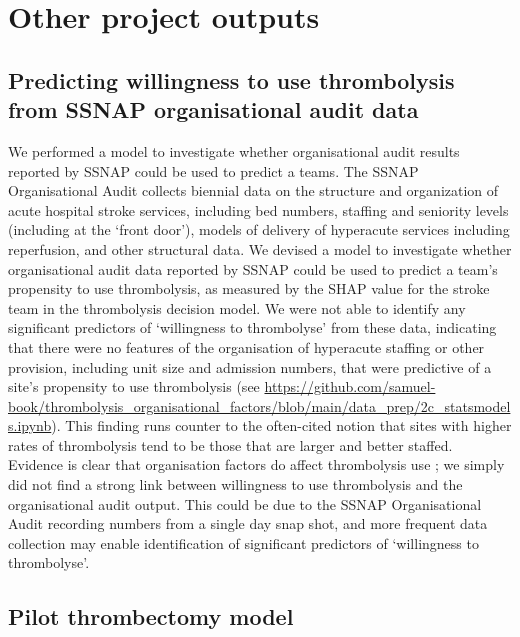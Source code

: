\section{Other project outputs}

\subsection{Predicting willingness to use thrombolysis from SSNAP organisational audit data}

We performed a model to investigate whether organisational audit results reported by SSNAP could be used to predict a teams. The SSNAP Organisational Audit collects biennial data on the structure and organization of acute hospital stroke services, including bed numbers, staffing and seniority levels (including at the ‘front door’), models of delivery of hyperacute services including reperfusion, and other structural data. We devised a model to investigate whether organisational audit data reported by SSNAP could be used to predict a team’s propensity to use thrombolysis, as measured by the SHAP value for the stroke team in the thrombolysis decision model. We were not able to identify any significant predictors of ‘willingness to thrombolyse’ from these data, indicating that there were no features of the organisation of hyperacute staffing or other provision, including unit size and admission numbers, that were predictive of a site’s propensity to use thrombolysis (see \url{https://github.com/samuel-book/thrombolysis_organisational_factors/blob/main/data_prep/2c_statsmodels.ipynb}). This finding runs counter to the often-cited notion that sites with higher rates of thrombolysis tend to be those that are larger and better staffed. Evidence is clear that organisation factors do affect thrombolysis use \cite{carter-jones_stroke_2011}; we simply did not find a strong link between willingness to use thrombolysis and the organisational audit output. This could be due to the SSNAP Organisational Audit recording numbers from a single day snap shot, and more frequent data collection may enable identification of significant predictors of ‘willingness to thrombolyse’.

\subsection{Pilot thrombectomy model}

